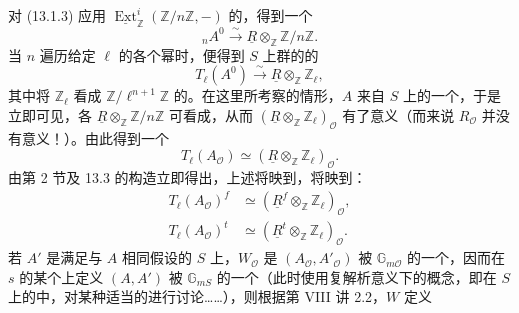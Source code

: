对 (13.1.3) 应用 $\underline{\operatorname{Ext}}^i_{\mathbb Z}(\mathbb Z/n\mathbb Z,-)$ 的，得到一个
\begin{equation}
 {}_nA^0\xrightarrow{\sim}\underline R\otimes_{\mathbb Z}\mathbb Z/n\mathbb Z.
 \tag{13.5.5}
\end{equation}
当 $n$ 遍历给定 $\ell$ 的各个幂时，便得到 $S$ 上群的的
\begin{equation}
 T_\ell(A^0)\xrightarrow{\sim}\underline R\otimes_{\mathbb Z}\mathbb Z_\ell,
 \tag{13.5.6}
\end{equation}
其中将 $\mathbb Z_\ell$ 看成 $\mathbb Z/\ell^{n+1}\mathbb Z$ 的。在这里所考察的情形，$A$ 来自 $S$ 上的一个，于是立即可见，各 $\underline R\otimes_{\mathbb Z}\mathbb Z/n\mathbb Z$ 可看成，从而 $(\underline R\otimes_{\mathbb Z}\mathbb Z_\ell)_{\mathcal O}$ 有了意义（而来说 $R_{\mathcal O}$ 并没有意义！）。由此得到一个
\begin{equation}
 T_\ell(A_{\mathcal O})\simeq
 (\underline R\otimes_{\mathbb Z}\mathbb Z_\ell)_{\mathcal O}.
 \tag{13.5.7}
\end{equation}
由第 2 节及 13.3 的构造立即得出，上述将映到，将映到：
\begin{equation}
 \begin{aligned}
 T_\ell(A_{\mathcal O})^f&\simeq
 (\underline R^f\otimes_{\mathbb Z}\mathbb Z_\ell)_{\mathcal O},\\
 T_\ell(A_{\mathcal O})^t&\simeq
 (\underline R^t\otimes_{\mathbb Z}\mathbb Z_\ell)_{\mathcal O}.
 \end{aligned}
 \tag{13.5.8}
\end{equation}
若 $A'$ 是满足与 $A$ 相同假设的 $S$ 上，$W_{\mathcal O}$ 是 $(A_{\mathcal O},A'_{\mathcal O})$ 被 $\mathbb G_{m\mathcal O}$ 的一个，因而在 $s$ 的某个上定义 $(A,A')$ 被 $\mathbb G_{mS}$ 的一个（此时使用复解析意义下的概念，即在 $S$ 上的中，对某种适当的进行讨论……），则根据第 VIII 讲 2.2，$W$ 定义
